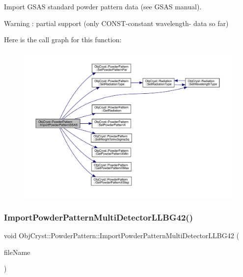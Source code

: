 Import G\+S\+AS standard powder pattern data (see G\+S\+AS manual). \begin{DoxyWarning}{Warning}
\+: partial support (only C\+O\+N\+S\+T-\/constant wavelength-\/ data so far) 
\end{DoxyWarning}
Here is the call graph for this function\+:
\nopagebreak
\begin{figure}[H]
\begin{center}
\leavevmode
\includegraphics[width=350pt]{class_obj_cryst_1_1_powder_pattern_a78be27d8764377f99e324a7181eac633_cgraph}
\end{center}
\end{figure}
\mbox{\label{class_obj_cryst_1_1_powder_pattern_abfc7890a1853583957284fc1a2644855}} 
\subsubsection{\texorpdfstring{ImportPowderPatternMultiDetectorLLBG42()}{ImportPowderPatternMultiDetectorLLBG42()}}
{\footnotesize\ttfamily void Obj\+Cryst\+::\+Powder\+Pattern\+::\+Import\+Powder\+Pattern\+Multi\+Detector\+L\+L\+B\+G42 (\begin{DoxyParamCaption}\item[{const string \&}]{file\+Name }\end{DoxyParamCaption})}



